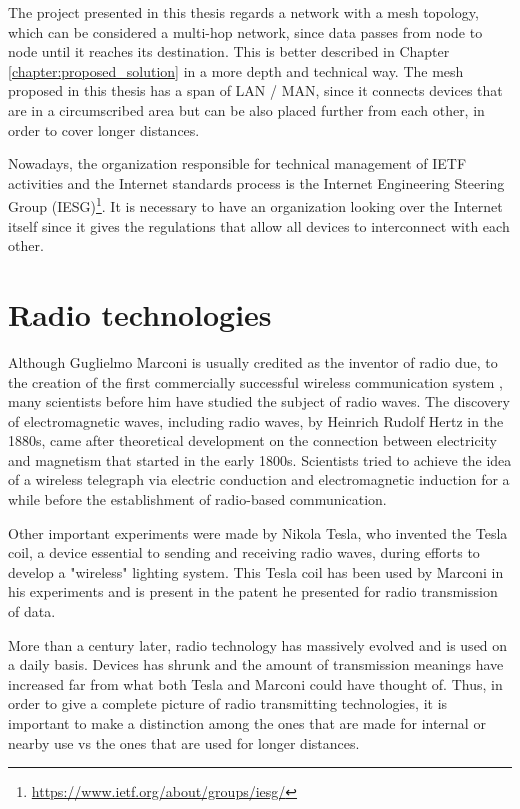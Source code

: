 		The project presented in this thesis regards a network with a mesh topology, which can be considered a multi-hop network, since data passes from node to node until it reaches its destination.
		This is better described in Chapter \ref{chapter:proposed_solution} in a more depth and technical way.
		The mesh proposed in this thesis has a span of LAN / MAN, since it connects devices that are in a circumscribed area but can be also placed further from each other, in order to cover longer distances.
			
		Nowadays, the organization responsible for technical management of IETF activities and the Internet standards process is the Internet Engineering Steering Group (IESG)\footnote{\url{https://www.ietf.org/about/groups/iesg/}}.
		It is necessary to have an organization looking over the Internet itself since it gives the regulations that allow all devices to interconnect with each other.
	
	\section{Radio technologies}\label{sec:radio_tech}
		
		Although Guglielmo Marconi is usually credited as the inventor of radio due, to the creation of the first commercially successful wireless communication system \cite{4137304}, many scientists before him have studied the subject of radio waves.
		The discovery of electromagnetic waves, including radio waves, by Heinrich Rudolf Hertz in the 1880s, came after theoretical development on the connection between electricity and magnetism that started in the early 1800s.
		Scientists tried to achieve the idea of a wireless telegraph via electric conduction and electromagnetic induction for a while before the establishment of radio-based communication.
		
		Other important experiments were made by Nikola Tesla, who invented the Tesla coil, a device essential to sending and receiving radio waves, during efforts to develop a "wireless" lighting system.
		This Tesla coil has been used by Marconi in his experiments and is present in the patent he presented for radio transmission of data.
		
		More than a century later, radio technology has massively evolved and is used on a daily basis.
		Devices has shrunk and the amount of transmission meanings have increased far from what both Tesla and Marconi could have thought of.
		Thus, in order to give a complete picture of radio transmitting technologies, it is important to make a distinction among the ones that are made for internal or nearby use vs the ones that are used for longer distances.
		
